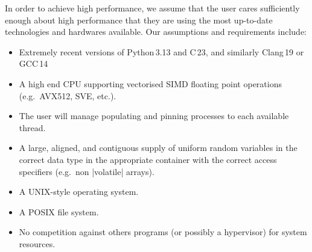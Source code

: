 In order to achieve high performance, we assume that the user cares sufficiently enough about high performance that they are using the most up-to-date technologies and hardwares available. Our assumptions and requirements include:
\begin{itemize}
\item Extremely recent versions of \mbox{Python\,3.13} and \mbox{C\,23}, and similarly \mbox{Clang\,19} or \mbox{GCC\,14}

\item A high end CPU supporting vectorised SIMD floating point operations (e.g.\ AVX512, SVE, etc.).

\item The user will manage populating and pinning processes to each available thread.

\item A large, aligned, and contiguous supply of uniform random variables in the correct data type in the appropriate container with the correct access specifiers (e.g.\ non \inlineplain|volatile| arrays).

\item A UNIX-style operating system. 

\item A POSIX file system.

\item No competition against others programs (or possibly a hypervisor) for system resources. 
\end{itemize}

